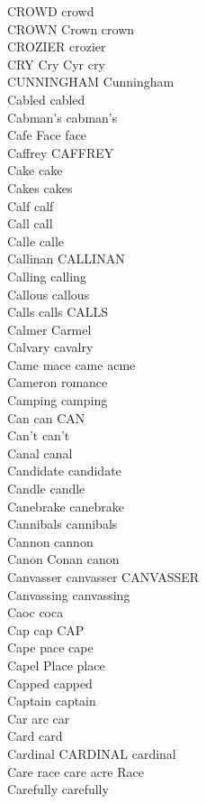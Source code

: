 CROWD crowd\\
CROWN Crown crown\\
CROZIER crozier\\
CRY Cry Cyr cry\\
CUNNINGHAM Cunningham\\
Cabled cabled\\
Cabman's cabman's\\
Cafe Face face\\
Caffrey CAFFREY\\
Cake cake\\
Cakes cakes\\
Calf calf\\
Call call\\
Calle calle\\
Callinan CALLINAN\\
Calling calling\\
Callous callous\\
Calls calls CALLS\\
Calmer Carmel\\
Calvary cavalry\\
Came mace came acme\\
Cameron romance\\
Camping camping\\
Can can CAN\\
Can't can't\\
Canal canal\\
Candidate candidate\\
Candle candle\\
Canebrake canebrake\\
Cannibals cannibals\\
Cannon cannon\\
Canon Conan canon\\
Canvasser canvasser CANVASSER\\
Canvassing canvassing\\
Caoc coca\\
Cap cap CAP\\
Cape pace cape\\
Capel Place place\\
Capped capped\\
Captain captain\\
Car arc car\\
Card card\\
Cardinal CARDINAL cardinal\\
Care race care acre Race\\
Carefully carefully\\
